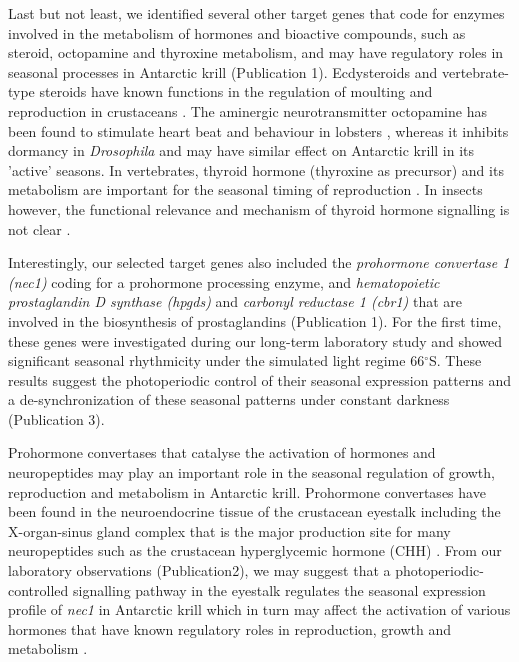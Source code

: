 Last but not least, we identified several other target genes that code for
enzymes involved in the metabolism of hormones and bioactive compounds, such as
steroid, octopamine and thyroxine metabolism, and may have regulatory roles in
seasonal processes in Antarctic krill (Publication 1). Ecdysteroids and
vertebrate-type steroids have known functions in the regulation of moulting and
reproduction in crustaceans \citep{lafont_steroids_2007}. The aminergic
neurotransmitter octopamine has been found to stimulate heart beat and
behaviour in lobsters \citep{battelle_targets_1978, kravitz_hormonal_1988},
whereas it inhibits dormancy in \textit{Drosophila}
\citep{andreatta_aminergic_2018} and may have similar effect on Antarctic krill
in its 'active' seasons. In vertebrates, thyroid hormone (thyroxine as
precursor) and its metabolism are important for the seasonal timing of
reproduction \citep{nishiwaki-ohkawa_molecular_2016,
saenzdemiera_circannual_2014}. In insects however, the functional relevance and
mechanism of thyroid hormone signalling is not clear
\citep{flatt_comparing_2006}.

Interestingly, our selected target genes also included the \textit{prohormone
convertase 1 (nec1)} coding for a prohormone processing enzyme, and
\textit{hematopoietic prostaglandin D synthase (hpgds)} and \textit{carbonyl
reductase 1 (cbr1)} that are involved in the biosynthesis of prostaglandins
(Publication 1). For the first time, these genes were investigated during our
long-term laboratory study and showed significant seasonal rhythmicity under
the simulated light regime 66$^{\circ}$S. These results suggest the photoperiodic
control of their seasonal expression patterns and a de-synchronization of these
seasonal patterns under constant darkness (Publication 3).

Prohormone convertases that catalyse the activation of hormones and
neuropeptides \citep{zhou_proteolytic_1999} may play an important role in the seasonal
regulation of growth, reproduction and metabolism in Antarctic krill.
Prohormone convertases have been found in the neuroendocrine tissue of the
crustacean eyestalk including the X-organ-sinus gland complex \citep{tangprasittipap_structure_2012, toullec_molecular_2002} that is the major production site for many
neuropeptides such as the crustacean hyperglycemic hormone (CHH)
\citep{nagaraju_reproductive_2011}. From our laboratory observations
(Publication2), we may suggest that a photoperiodic-controlled signalling
pathway in the eyestalk regulates the seasonal expression profile of
\textit{nec1} in Antarctic krill which in turn may affect the activation of
various hormones that have known regulatory roles in reproduction, growth and
metabolism \citep{nagaraju_reproductive_2011}.

